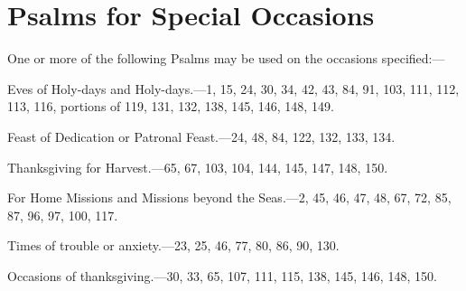 \section{Psalms for Special Occasions}
{\scriptsize
One or more of the following Psalms may be used on the occasions specified:—

\begin{hangparas}{.25in}{1}
Eves of Holy-days and Holy-days.—1, 15, 24, 30, 34, 42, 43, 84, 91, 103, 111, 112, 113, 116, portions of 119, 131, 132, 138, 145, 146, 148, 149.

Feast of Dedication or Patronal Feast.—24, 48, 84, 122, 132, 133, 134.

Thanksgiving for Harvest.—65, 67, 103, 104, 144, 145, 147, 148, 150.

For Home Missions and Missions beyond the Seas.—2, 45, 46, 47, 48, 67, 72, 85, 87, 96, 97, 100, 117.

Times of trouble or anxiety.—23, 25, 46, 77, 80, 86, 90, 130.

Occasions of thanksgiving.—30, 33, 65, 107, 111, 115, 138, 145, 146, 148, 150.

\end{hangparas}
}

\fleuron